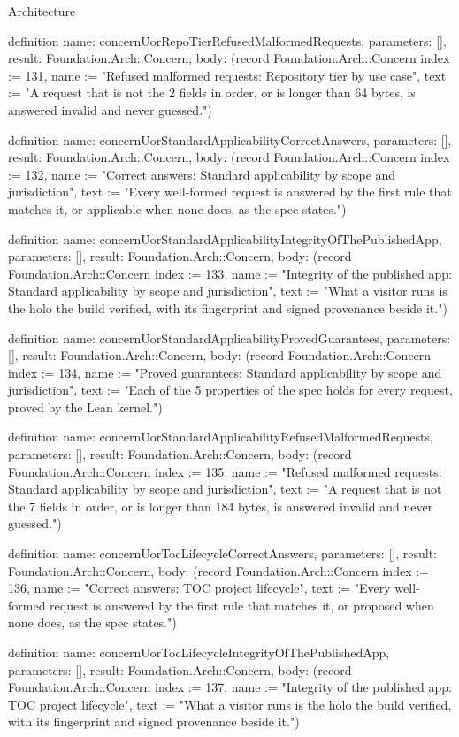 \begin{lexlean}{Architecture}
\begin{semanticmodule}
definition{
  name: concernUorRepoTierRefusedMalformedRequests,
  parameters: [],
  result: Foundation.Arch::Concern,
  body: (record Foundation.Arch::Concern {index := 131, name := "Refused malformed requests: Repository tier by use case", text := "A request that is not the 2 fields in order, or is longer than 64 bytes, is answered invalid and never guessed."})
}

definition{
  name: concernUorStandardApplicabilityCorrectAnswers,
  parameters: [],
  result: Foundation.Arch::Concern,
  body: (record Foundation.Arch::Concern {index := 132, name := "Correct answers: Standard applicability by scope and jurisdiction", text := "Every well-formed request is answered by the first rule that matches it, or applicable when none does, as the spec states."})
}

definition{
  name: concernUorStandardApplicabilityIntegrityOfThePublishedApp,
  parameters: [],
  result: Foundation.Arch::Concern,
  body: (record Foundation.Arch::Concern {index := 133, name := "Integrity of the published app: Standard applicability by scope and jurisdiction", text := "What a visitor runs is the holo the build verified, with its fingerprint and signed provenance beside it."})
}

definition{
  name: concernUorStandardApplicabilityProvedGuarantees,
  parameters: [],
  result: Foundation.Arch::Concern,
  body: (record Foundation.Arch::Concern {index := 134, name := "Proved guarantees: Standard applicability by scope and jurisdiction", text := "Each of the 5 properties of the spec holds for every request, proved by the Lean kernel."})
}

definition{
  name: concernUorStandardApplicabilityRefusedMalformedRequests,
  parameters: [],
  result: Foundation.Arch::Concern,
  body: (record Foundation.Arch::Concern {index := 135, name := "Refused malformed requests: Standard applicability by scope and jurisdiction", text := "A request that is not the 7 fields in order, or is longer than 184 bytes, is answered invalid and never guessed."})
}

definition{
  name: concernUorTocLifecycleCorrectAnswers,
  parameters: [],
  result: Foundation.Arch::Concern,
  body: (record Foundation.Arch::Concern {index := 136, name := "Correct answers: TOC project lifecycle", text := "Every well-formed request is answered by the first rule that matches it, or proposed when none does, as the spec states."})
}

definition{
  name: concernUorTocLifecycleIntegrityOfThePublishedApp,
  parameters: [],
  result: Foundation.Arch::Concern,
  body: (record Foundation.Arch::Concern {index := 137, name := "Integrity of the published app: TOC project lifecycle", text := "What a visitor runs is the holo the build verified, with its fingerprint and signed provenance beside it."})
}


\end{semanticmodule}
\end{lexlean}
